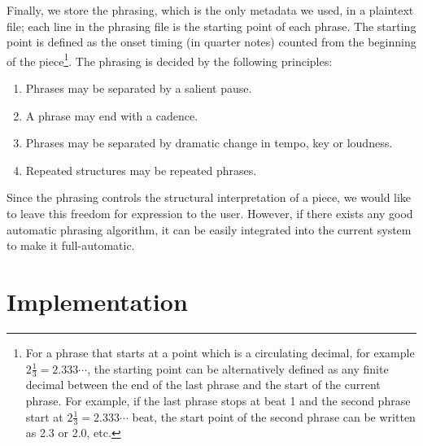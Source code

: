 Finally, we store the phrasing, which is the only metadata we used, in a plaintext file; each line in the phrasing file is the starting point of each phrase. The starting point is defined as the onset timing (in quarter notes) counted from the beginning of the piece\footnote{For a phrase that starts at a point which is a circulating decimal, for example $2\frac{1}{3}=2.333\cdots$, the starting point can be alternatively defined as any finite decimal between the end of the last phrase and the start of the current phrase. For example, if the last phrase stops at beat 1 and the second phrase start at $2\frac{1}{3}=2.333\cdots$ beat, the start point of the second phrase can be written as 2.3 or 2.0, etc.}. The phrasing is decided by the following principles: 
\begin{enumerate}
   \item Phrases may be separated by a salient pause.
   \item A phrase may end with a cadence.
   \item Phrases may be separated by dramatic change in tempo, key or loudness.
   \item Repeated structures may be repeated phrases.
\end{enumerate}

Since the phrasing controls the structural interpretation of a piece, we would like to leave this freedom for expression to the user. However, if there exists any good automatic phrasing algorithm, it can be easily integrated into the current system to make it full-automatic.

 
\section{Implementation}

